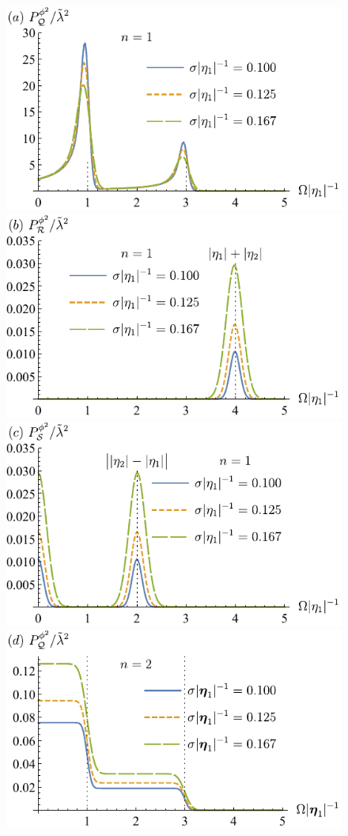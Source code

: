 \documentclass[prd,twocolumn,superscriptaddress,nofootinbib,floatfix,amsmath,amssymb]{revtex4-2}
\begin{document}
    \begin{figure}[tp]
        \centering
        \includegraphics[scale=0.64]{Fig6a.pdf}
        \includegraphics[scale=0.64]{Fig6b.pdf}
        \includegraphics[scale=0.64]{Fig6c.pdf}
        \includegraphics[scale=0.64]{Fig6d.pdf}

\end{figure}
\end{document}
